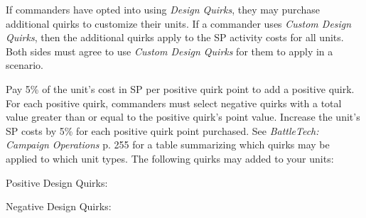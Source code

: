 If commanders have opted into using \emph{Design Quirks}, they may purchase additional quirks to customize their units.
If a commander uses \emph{Custom Design Quirks}, then the additional quirks apply to the SP activity costs for all units.
Both sides must agree to use \emph{Custom Design Quirks} for them to apply in a scenario.

Pay 5\% of the unit's cost in SP per positive quirk point to add a positive quirk.
For each positive quirk, commanders must select negative quirks with a total value greater than or equal to the positive quirk's point value.
Increase the unit's SP costs by 5\% for each positive quirk point purchased.
See \emph{BattleTech: Campaign Operations} p. 255 for a table summarizing which quirks may be applied to which unit types. The following quirks may added to your units:

Positive Design Quirks:



Negative Design Quirks:


